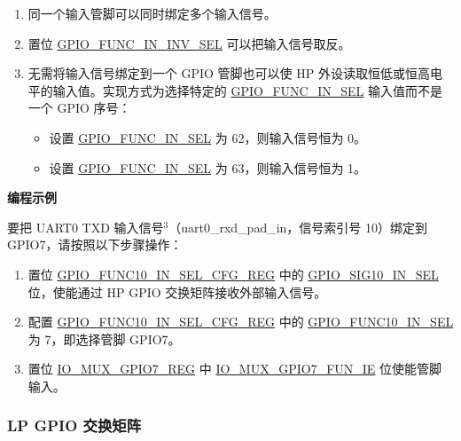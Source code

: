 \documentclass[main\_\_CN.tex]{subfiles}
\begin{document}
\begin{tiplisting}
\vspace{-2em}
\begin{enumerate}
\item \label{input-note-1} 同一个输入管脚可以同时绑定多个输入信号。
\item \label{input-note-2} 置位 \hyperref[fielddesc:GPIOFUNCNININVSEL]{GPIO\_FUNC\_IN\_INV\_SEL} 可以把输入信号取反。
\item \label{input-note-3} 无需将输入信号绑定到一个 GPIO 管脚也可以使 HP 外设读取恒低或恒高电平的输入值。实现方式为选择特定的 \hyperref[fielddesc:GPIOFUNCNINSEL]{GPIO\_FUNC\_IN\_SEL} 输入值而不是一个 GPIO 序号：
\begin {itemize}
\item 设置 \hyperref[fielddesc:GPIOFUNCNINSEL]{GPIO\_FUNC\_IN\_SEL} 为 62，则输入信号恒为 0。
\item 设置 \hyperref[fielddesc:GPIOFUNCNINSEL]{GPIO\_FUNC\_IN\_SEL} 为 63，则输入信号恒为 1。
\end{itemize}
\end{enumerate}
\end{tiplisting}

\textbf{编程示例}

要把 UART0 TXD 输入信号\hyperref[input-note-3]{$^3$}（uart0\_rxd\_pad\_in，信号索引号 10）绑定到 GPIO7，请按照以下步骤操作：
\begin{enumerate}
\item 置位 \hyperref[regdesc:GPIOFUNCNINSELCFGREG]{GPIO\_FUNC10\_IN\_SEL\_CFG\_REG} 中的 \hyperref[fielddesc:GPIOSIGNINSEL]{GPIO\_SIG10\_IN\_SEL} 位，使能通过 HP GPIO 交换矩阵接收外部输入信号。
\item 配置 \hyperref[regdesc:GPIOFUNCNINSELCFGREG]{GPIO\_FUNC10\_IN\_SEL\_CFG\_REG} 中的 \hyperref[fielddesc:GPIOFUNCNINSEL]{GPIO\_FUNC10\_IN\_SEL} 为 7，即选择管脚 GPIO7。
\item 置位 \hyperref[regdesc:IOMUXGPIONREG]{IO\_MUX\_GPIO7\_REG} 中 \hyperref[fielddesc:IOMUXGPIONFUNIE]{IO\_MUX\_GPIO7\_FUN\_IE} 位使能管脚输入。
\end{enumerate}

\subsubsection{LP GPIO 交换矩阵}
\end{document}
